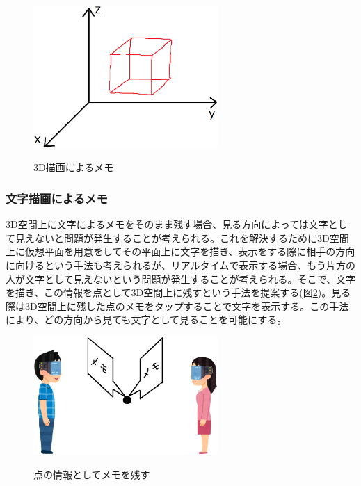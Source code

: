 \documentclass{hissymp}
\begin{document}
\begin{figure}[h]
  \begin{center}
    \includegraphics[clip,width=7.0cm]{./3d_draw.eps}
    \caption{3D描画によるメモ}
    \label{fig:3d_draw}
  \end{center}
\end{figure}

\subsubsection{文字描画によるメモ}
3D空間上に文字によるメモをそのまま残す場合、見る方向によっては文字として見えないと問題が発生することが考えられる。これを解決するために3D空間上に仮想平面を用意をしてその平面上に文字を描き、表示をする際に相手の方向に向けるという手法も考えられるが、リアルタイムで表示する場合、もう片方の人が文字として見えないという問題が発生することが考えられる。そこで、文字を描き、この情報を点として3D空間上に残すという手法を提案する(図\ref{fig:tennomemo})。見る際は3D空間上に残した点のメモをタップすることで文字を表示する。この手法により、どの方向から見ても文字として見ることを可能にする。

\begin{figure}[h]
  \begin{center}
    \includegraphics[clip,width=7.0cm]{./tennomemo.eps}
    \caption{点の情報としてメモを残す}
    \label{fig:tennomemo}
  \end{center}
\end{figure}
\end{document}
